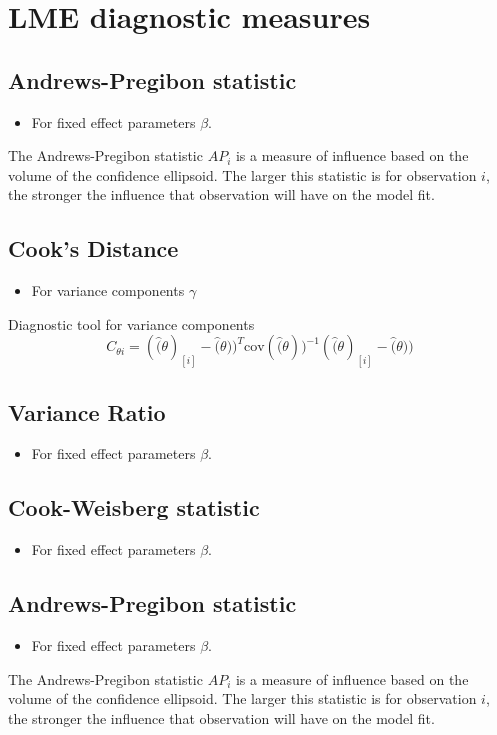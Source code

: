 \documentclass[12pt, a4paper]{report}
\theoremstyle{plain}
\theoremstyle{definition}
\theoremstyle{remark}
\begin{document}
	\section{LME diagnostic measures}
	\subsection{Andrews-Pregibon statistic} %
	\begin{itemize}
		\item For fixed effect parameters $\beta$.
	\end{itemize}
	The Andrews-Pregibon statistic $AP_{i}$ is a measure of influence based on the volume of the confidence ellipsoid.
	The larger this statistic is for observation $i$, the stronger the influence that observation will have on the model fit.
	
	
	\subsection{Cook's Distance} %
	\begin{itemize}
		\item For variance components $\gamma$
	\end{itemize}
	
	Diagnostic tool for variance components
	\[ C_{\theta i} =(\hat(\theta)_{[i]} - \hat(\theta))^{T}\mbox{cov}( \hat(\theta))^{-1}(\hat(\theta)_{[i]} - \hat(\theta))\]
	
	
	\subsection{Variance Ratio} %
	\begin{itemize}
		\item For fixed effect parameters $\beta$.
	\end{itemize}
	
	
	\subsection{Cook-Weisberg statistic} %
	\begin{itemize}
		\item For fixed effect parameters $\beta$.
	\end{itemize}
	
	\subsection{Andrews-Pregibon statistic} %
	\begin{itemize}
		\item For fixed effect parameters $\beta$.
	\end{itemize}
	The Andrews-Pregibon statistic $AP_{i}$ is a measure of influence based on the volume of the confidence ellipsoid.
	The larger this statistic is for observation $i$, the stronger the influence that observation will have on the model fit.
	
\end{document}
